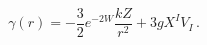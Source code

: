 \begin{equation}
\gamma(r) = - \frac 32 e^{-2W} \frac{kZ}{r^2} + 3g X^I V_I\,. \label{gamma}
\end{equation}

